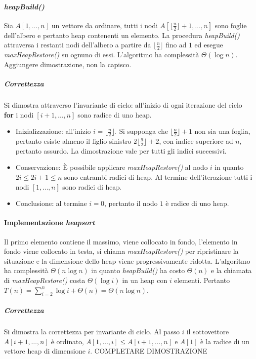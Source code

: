\paragraph{\emph{heapBuild()}}
Sia $A[1,\dots, n]$ un vettore da ordinare, tutti i nodi $A[\lfloor \frac{n}{2}\rfloor+1,\dots, n]$ sono foglie dell'albero e pertanto heap contenenti un 
elemento. La procedura \emph{heapBuild()} attraversa i restanti nodi dell'albero a partire da $\lfloor \frac{n}{2}\rfloor$ fino ad $1$ ed esegue 
\emph{maxHeapRestore()} su ognuno di essi. L'algoritmo ha complessit\`a $\Theta(\log n)$. Aggiungere dimostrazione, non la capisco.

\subparagraph{Correttezza}
Si dimostra attraverso l'invariante di ciclo: all'inizio di ogni iterazione del ciclo \textbf{for} i nodi $[i+1,\dots, n]$ sono radice di uno heap.
\begin{itemize}
\item Inizializzazione: all'inizio $i=\lfloor \frac{n}{2}\rfloor$. Si supponga che $\lfloor \frac{n}{2}\rfloor+1$ non sia una foglia, pertanto esiste almeno
il figlio sinistro $2\lfloor \frac{n}{2}\rfloor+2$, con indice superiore ad $n$, pertanto assurdo. La dimostrazione vale per tutti gli indici successivi.
\item Conservazione: \`E possibile applicare \emph{maxHeapRestore()} al nodo $i$ in quanto $2i\le 2i+1\le n$ sono entrambi radici di heap. Al termine 
dell'iterazione tutti i nodi $[1,\dots, n]$ sono radici di heap.
\item Conclusione: al termine $i=0$, pertanto il nodo $1$ \`e radice di uno heap. 
\end{itemize}
\paragraph{Implementazione \emph{heapsort}}
Il primo elemento contiene il massimo, viene collocato in fondo, l'elemento in fondo viene collocato in testa, si chiama \emph{maxHeapRestore()} per 
ripristinare la situazione e la dimensione dello heap viene progressivamente ridotta. L'algoritmo ha complessit\`a $\Theta(n\log n)$ in quanto 
\emph{heapBuild()} ha costo $\Theta(n)$ e la chiamata di \emph{maxHeapRestore()} costa $\Theta(\log i)$ in un heap con $i$ elementi. Pertanto 
$T(n)=\sum\limits_{i=2}^n\log i+\Theta(n)=\Theta(n\log n)$.

\subparagraph{Correttezza}
Si dimostra la correttezza per invariante di ciclo. Al passo $i$ il sottovettore $A[i+1,\dots, n]$ \`e ordinato, $A[1,\dots, i]\le A[i+1, \dots, n]$ e 
$A[1]$ \`e la radice di un vettore heap di dimensione $i$. COMPLETARE DIMOSTRAZIONE
